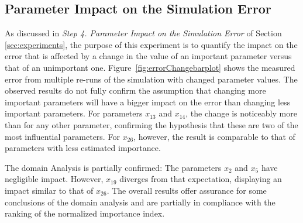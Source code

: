 \documentclass[conference]{IEEEtran}
\begin{document}
\subsection{Parameter Impact on the Simulation Error}

As discussed in \emph{Step 4. Parameter Impact on the Simulation Error} of Section \ref{sec:experiments}, the purpose of this experiment is to quantify the impact on the error that is affected by a change in the value of an important parameter versus that of an unimportant one. Figure~\ref{fig:errorChangebarplot} shows the measured error from multiple re-runs of the simulation with changed parameter values. 
The observed results do not fully confirm the assumption that changing more important parameters will have a bigger impact on the error than changing less important parameters. For parameters \emph{$x_{13}$} and \emph{$x_{14}$}, the change is noticeably more than for any other parameter, 
confirming the hypothesis that these are two of the most influential parameters. For \emph{$x_{26}$}, however, the result is comparable to that of parameters with less estimated importance.

The domain Analysis is partially confirmed: The parameters \emph{$x_{2}$} and \emph{$x_{5}$} have negligible impact.
However, \emph{$x_{19}$} diverges from that expectation, displaying an impact similar to that of \emph{$x_{26}$}. 
The overall results offer assurance for some conclusions of the domain analysis and are partially in compliance with the ranking of the normalized importance index. 
\end{document}
